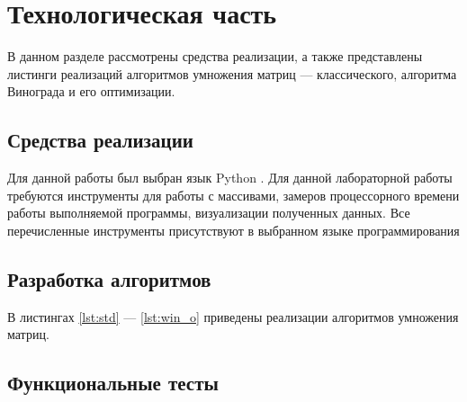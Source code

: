 \chapter{Технологическая часть}
В данном разделе рассмотрены средства реализации, а также представлены листинги реализаций алгоритмов умножения матриц --- классического, алгоритма Винограда и его оптимизации.
\section{Средства реализации}
Для данной работы был выбран язык Python \cite{python}. Для данной лабораторной работы требуются инструменты для работы с массивами, замеров процессорного времени работы выполняемой программы, визуализации полученных данных. Все перечисленные инструменты присутствуют в выбранном языке программирования


\section{Разработка алгоритмов}
В листингах \ref{lst:std} --- \ref{lst:win_o} приведены реализации алгоритмов умножения матриц.

\clearpage
{}
\clearpage



\section{Функциональные тесты}

